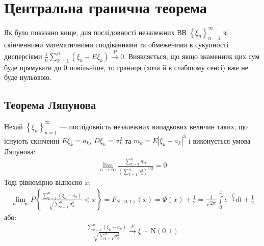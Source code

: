 \section{Центральна гранична теорема}
Як було показано вище, для послідовності незалежних ВВ 
$\left\{ \xi_n\right\}_{n=1}^\infty$ зі скінченними математичними сподіваннями та обмеженими в сукупності
дисперсіями $\frac{1}{n}\sum\limits_{k=1}^n (\xi_k - E\xi_k) \overset{P}{\longrightarrow} 0$.
Виявляється, що якщо знаменник цих сум буде прямувати до $0$ повільніше, то границя (хоча й в слабшому сенсі) вже не буде нульовою.
\subsection{Теорема Ляпунова}
\begin{theorem*}
    Нехай $\left\{ \xi_n\right\}_{n=1}^\infty$ --- послідовність незалежних випадкових величин таких, 
    що існують скінченні $E\xi_k = a_k$, $D\xi_k = \sigma_k^2$ та
    $m_k = E\left|\xi_k - a_k\right|^3$ і виконується умова Ляпунова:
    \begin{gather*}
        \lim_{n \rightarrow \infty} \frac{\sum\limits_{k=1}^n m_k}{\left(
            \sum\limits_{k=1}^n \sigma_k^2
        \right)^{3/2}} = 0
    \end{gather*}
    Тоді рівномірно відносно $x$:
    \begin{gather}
        \lim_{n \rightarrow \infty} P \left\{
            \frac{\sum\limits_{k=1}^n (\xi_k - a_k)}
            {\sqrt{\sum\limits_{k=1}^n \sigma_k^2}}
            < x
        \right\} = F_{\mathrm{N}(0, 1)}(x) = \Phi(x) + \frac{1}{2} = 
        \frac{1}{\sqrt{2\pi}} \int\limits_0^x e^{-\frac{t^2}{2}} dt + \frac{1}{2}
    \end{gather}
    або:
    \begin{gather*}
        \frac{\sum\limits_{k=1}^n (\xi_k - a_k)}
        {\sqrt{\sum\limits_{k=1}^n \sigma_k^2}}
        \overset{F}{\longrightarrow} \xi \sim \mathrm{N}(0, 1)
    \end{gather*}
\end{theorem*}
